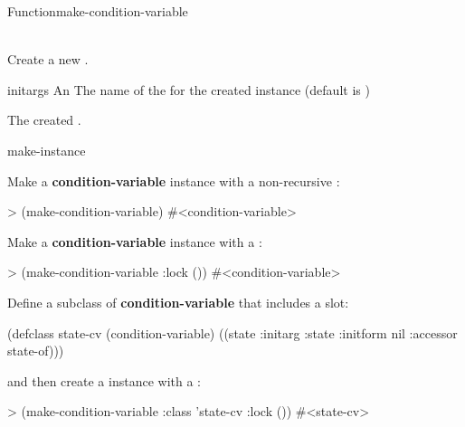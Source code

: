 \documentclass[10pt,twoside,english,pdftex]{article}
\begin{document}
\begin{functiondoc}{Function}{make-condition-variable}%
  {  \\ 
     \\
   \returns{} }
%
%
%
 
\fnsyntax

\fnpurpose Create a new .

\fnpackage {}

\fnmodule {}

\fnargs
\begin{args}{initargs}
\arg[initargs] An 
\arg[class] The name of the  for the created
 instance (default is )
\end{args}

\fnreturns
The created \textbf{}.

\begin{alsos}{make-instance}
\end{alsos}

\fnexamples
Make a \textbf{condition-variable} instance with a non-recursive 
:
\begin{example}
> (make-condition-variable)
#<condition-variable>
\end{example}

Make a \textbf{condition-variable} instance with a
:
\begin{example}
> (make-condition-variable :lock ())
#<condition-variable>
\end{example}

Define a subclass of \textbf{condition-variable} that includes a 
 slot:
\begin{example}
  (defclass state-cv (condition-variable)
    ((state :initarg :state
            :initform nil
            :accessor state-of)))
\end{example}
and then create a  instance with a :
\begin{example}
> (make-condition-variable :class 'state-cv
                           :lock ())
#<state-cv>
\end{example}

\end{functiondoc}
\end{document}
